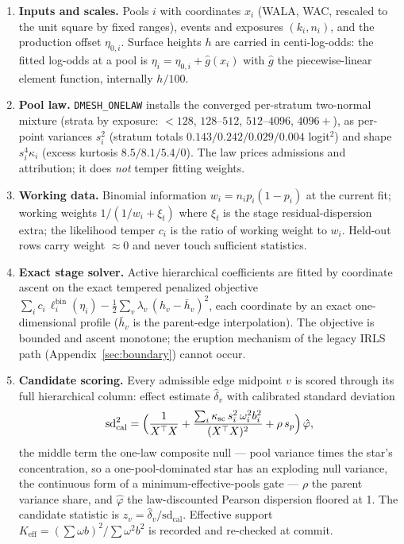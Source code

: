 \documentclass[11pt]{article}
\begin{document}
\begin{enumerate}[leftmargin=2em,itemsep=3pt]

\item \textbf{Inputs and scales.} Pools $i$ with coordinates $x_i$ (WALA, WAC,
rescaled to the unit square by fixed ranges), events and exposures $(k_i,n_i)$,
and the production offset $\eta_{0,i}$. Surface heights $h$ are carried in
centi-log-odds: the fitted log-odds at a pool is
$\eta_i=\eta_{0,i}+\hat g(x_i)$ with $\hat g$ the piecewise-linear element
function, internally $h/100$.

\item \textbf{Pool law.} \texttt{DMESH\_ONELAW} installs the converged
per-stratum two-normal mixture (strata by exposure: $<128$, $128$--$512$,
$512$--$4096$, $4096+$), as per-point variances $s^2_i$ (stratum totals
$0.143/0.242/0.029/0.004$ logit$^2$) and shape $s^4_i\kappa_i$ (excess
kurtosis $8.5/8.1/5.4/0$). The law prices admissions and attribution; it does
\emph{not} temper fitting weights.

\item \textbf{Working data.} Binomial information $w_i=n_ip_i(1-p_i)$ at the
current fit; working weights $1/(1/w_i+\xi_t)$ where $\xi_t$ is the stage
residual-dispersion extra; the likelihood temper $c_i$ is the ratio of working
weight to $w_i$. Held-out rows carry weight $\approx 0$ and never touch
sufficient statistics.

\item \textbf{Exact stage solver.} Active hierarchical coefficients are fitted
by coordinate ascent on the exact tempered penalized objective
$\sum_i c_i\,\ell^{\mathrm{bin}}_i(\eta_i) - \tfrac12\sum_v
\lambda_v\,(h_v-\bar h_v)^2$, each coordinate by an exact one-dimensional
profile ($\bar h_v$ is the parent-edge interpolation). The objective is
bounded and ascent monotone; the eruption mechanism of the legacy IRLS path
(Appendix~\ref{sec:boundary}) cannot occur.

\item \textbf{Candidate scoring.} Every admissible edge midpoint $v$ is scored
through its full hierarchical column: effect estimate $\hat\delta_v$ with
calibrated standard deviation
\[
\mathrm{sd}^2_{\mathrm{cal}}
=\Bigl(\frac{1}{X^\top X}
+\frac{\sum_i \kappa_{\mathrm{sc}}\, s^2_i\,\omega_i^2 b_i^2}{(X^\top X)^2}
+\rho\, s_p\Bigr)\,\hat\varphi ,
\]
the middle term the one-law composite null --- pool variance times the star's
concentration, so a one-pool-dominated star has an exploding null variance,
the continuous form of a minimum-effective-pools gate --- $\rho$ the parent
variance share, and $\hat\varphi$ the law-discounted Pearson dispersion
floored at 1. The candidate statistic is $z_v=\hat\delta_v/\mathrm{sd}_{\mathrm{cal}}$.
Effective support $K_{\mathrm{eff}}=(\sum\omega b)^2/\sum\omega^2b^2$ is
recorded and re-checked at commit.


\end{enumerate}
\end{document}
